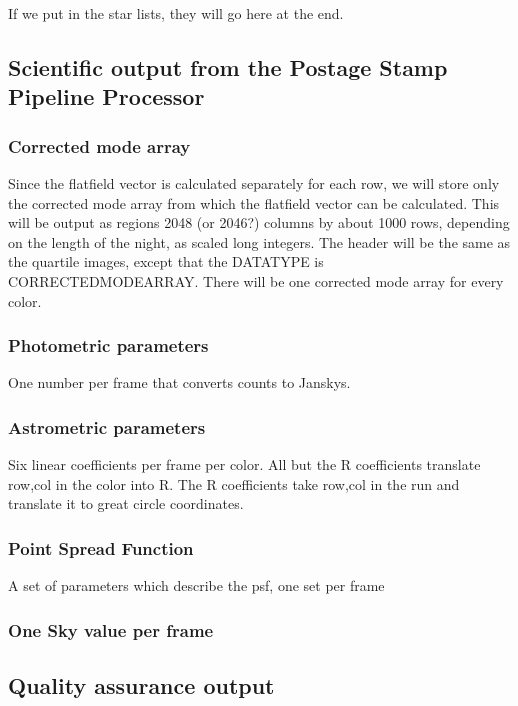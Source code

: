 	If we put in the star lists, they will go here at the end.

\subsection{Scientific output from the Postage Stamp Pipeline Processor}

\subsubsection{Corrected mode array}

Since the flatfield vector is calculated separately for each row, we will
store only the corrected mode array from which the flatfield vector can be
calculated.  This will be output as regions 2048 (or 2046?) columns by
about 1000 rows,
depending on the length of the night, as scaled long integers.  The header
will be the same as the quartile images, except that the DATATYPE is
CORRECTEDMODEARRAY.  There will be one corrected mode array for every color.

\subsubsection{Photometric parameters}

One number per frame that converts counts to Janskys.

\subsubsection{Astrometric parameters}

Six linear coefficients per frame per color.  All but the R coefficients
translate row,col in the color into R.  The R coefficients take row,col
in the run and translate it to great circle coordinates.

\subsubsection{Point Spread Function}

A set of parameters which describe the psf, one set per frame

\subsubsection{One Sky value per frame}

\subsection{Quality assurance output}

